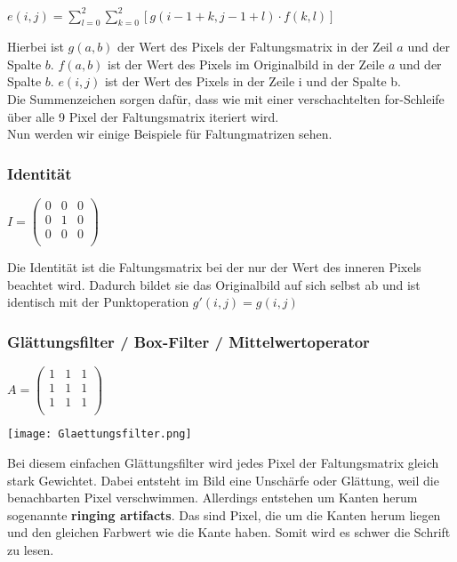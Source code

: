 $e(i, j) = \sum_{l=0}^{2} \sum_{k=0}^{2} [g(i-1+k, j-1+l) \cdot f(k, l)] $

Hierbei ist $g(a, b)$ der Wert des Pixels der Faltungsmatrix in der Zeil $a$ und der Spalte $b$. $f(a, b)$ ist der Wert des Pixels im Originalbild in der Zeile $a$ und der Spalte $b$. $e(i, j)$ ist der Wert des Pixels in der Zeile i und der Spalte b.\\
Die Summenzeichen sorgen dafür, dass wie mit einer verschachtelten for-Schleife über alle 9 Pixel der Faltungsmatrix iteriert wird.\\

Nun werden wir einige Beispiele für Faltungmatrizen sehen.

\subsubsection{Identität}

$
    I
    =
    \begin{pmatrix}
        0 & 0 & 0 \\
        0 & 1 & 0 \\
        0 & 0 & 0 \\
    \end{pmatrix}
$

Die Identität ist die Faltungsmatrix bei der nur der Wert des inneren Pixels beachtet wird. Dadurch bildet sie das Originalbild auf sich selbst ab und ist identisch mit der Punktoperation $g'(i,j) = g(i,j)$

\subsubsection{Glättungsfilter / Box-Filter / Mittelwertoperator}
\label{sec:mean-operator}

$
    A
    =
    \begin{pmatrix}
        1 & 1 & 1 \\
        1 & 1 & 1 \\
        1 & 1 & 1 \\
    \end{pmatrix}
$

\texttt{[image: Glaettungsfilter.png]}

Bei diesem einfachen Glättungsfilter wird jedes Pixel der Faltungsmatrix gleich stark Gewichtet. Dabei entsteht im Bild eine Unschärfe oder Glättung, weil die benachbarten Pixel verschwimmen. Allerdings entstehen um Kanten herum sogenannte \textbf{ringing artifacts}. Das sind Pixel, die um die Kanten herum liegen und den gleichen Farbwert wie die Kante haben. Somit wird es schwer die Schrift zu lesen.

